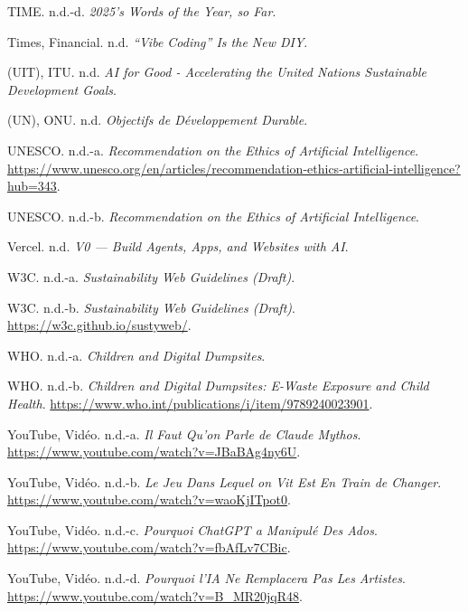 \documentclass[
  10pt,
  a4paper,
  DIV=11,
  numbers=noendperiod,
  oneside]{scrreprt}
\newlength{\cslhangindent}
\newenvironment{CSLReferences}[2] %
 {\begin{list}{}{%
  \setlength{\itemindent}{0pt}
  \setlength{\leftmargin}{0pt}
  \setlength{\parsep}{0pt}
  \ifodd #1
   \setlength{\leftmargin}{\cslhangindent}
   \setlength{\itemindent}{-1\cslhangindent}
  \fi
  \setlength{\itemsep}{#2\baselineskip}}}
 {\end{list}}
\let\oldemph\emph
\renewcommand{\emph}[1]{\oldemph{\textcolor{cmmgray}{#1}}}
\begin{document}
\begin{CSLReferences}{1}{1}
TIME. n.d.-d. \emph{2025's Words of the Year, so Far}.

Times, Financial. n.d. \emph{{``Vibe Coding''} Is the New DIY}.

(UIT), ITU. n.d. \emph{AI for Good - Accelerating the United Nations
Sustainable Development Goals}.

(UN), ONU. n.d. \emph{Objectifs de Développement Durable}.

UNESCO. n.d.-a. \emph{Recommendation on the Ethics of Artificial
Intelligence}.
\url{https://www.unesco.org/en/articles/recommendation-ethics-artificial-intelligence?hub=343}.

UNESCO. n.d.-b. \emph{Recommendation on the Ethics of Artificial
Intelligence}.

Vercel. n.d. \emph{V0 --- Build Agents, Apps, and Websites with AI}.

W3C. n.d.-a. \emph{Sustainability Web Guidelines (Draft)}.

W3C. n.d.-b. \emph{Sustainability Web Guidelines (Draft)}.
\url{https://w3c.github.io/sustyweb/}.

WHO. n.d.-a. \emph{Children and Digital Dumpsites}.

WHO. n.d.-b. \emph{Children and Digital Dumpsites: E-Waste Exposure and
Child Health}.
\url{https://www.who.int/publications/i/item/9789240023901}.

YouTube, Vidéo. n.d.-a. \emph{Il Faut Qu'on Parle de Claude Mythos}.
\url{https://www.youtube.com/watch?v=JBaBAg4ny6U}.

YouTube, Vidéo. n.d.-b. \emph{Le Jeu Dans Lequel on Vit Est En Train de
Changer}. \url{https://www.youtube.com/watch?v=waoKjITpot0}.

YouTube, Vidéo. n.d.-c. \emph{Pourquoi ChatGPT a Manipulé Des Ados}.
\url{https://www.youtube.com/watch?v=fbAfLv7CBic}.

YouTube, Vidéo. n.d.-d. \emph{Pourquoi l'IA Ne Remplacera Pas Les
Artistes}. \url{https://www.youtube.com/watch?v=B_MR20jqR48}.

\end{CSLReferences}
\end{document}
